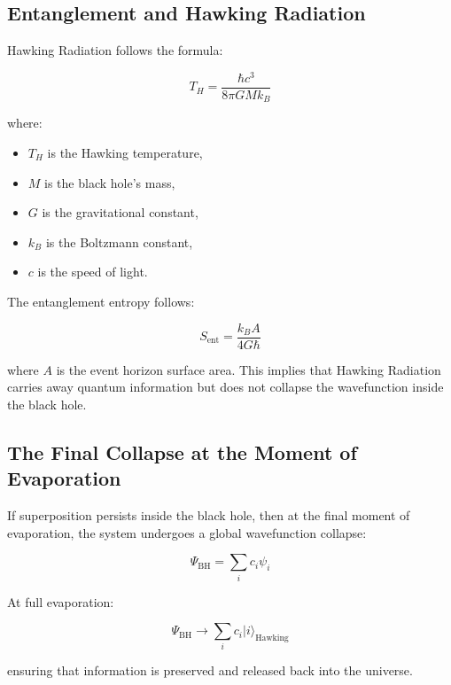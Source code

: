 \documentclass{article}
\begin{document}
\subsection{Entanglement and Hawking Radiation}

Hawking Radiation follows the formula:

\begin{equation}
T_H = \frac{\hbar c^3}{8\pi G M k_B}
\end{equation}

where:
\begin{itemize}
    \item \( T_H \) is the Hawking temperature,
    \item \( M \) is the black hole’s mass,
    \item \( G \) is the gravitational constant,
    \item \( k_B \) is the Boltzmann constant,
    \item \( c \) is the speed of light.
\end{itemize}

The entanglement entropy follows:

\begin{equation}
S_{\text{ent}} = \frac{k_B A}{4G\hbar}
\end{equation}

where \( A \) is the event horizon surface area. This implies that Hawking Radiation carries away quantum information but does not collapse the wavefunction inside the black hole.

\subsection{The Final Collapse at the Moment of Evaporation}

If superposition persists inside the black hole, then at the final moment of evaporation, the system undergoes a global wavefunction collapse:

\begin{equation}
\Psi_{\text{BH}} = \sum_i c_i \psi_i
\end{equation}

At full evaporation:

\begin{equation}
\Psi_{\text{BH}} \rightarrow \sum_i c_i |i\rangle_{\text{Hawking}}
\end{equation}

ensuring that information is preserved and released back into the universe.
\end{document}
